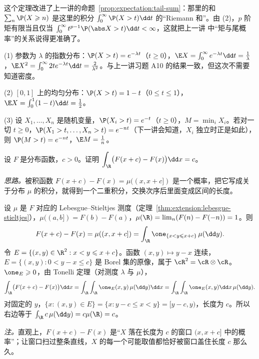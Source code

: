 这个定理改进了上一讲的命题~\ref{prop:expectation:tail-sum}：那里的和 $\sum_n\P(X\geqslant n)$ 是这里的积分 $\int_0^\infty \P(X>t)\dd t$ 的“Riemann 和”。由 (2)，$p$ 阶矩有限当且仅当 $\int_0^\infty t^{p-1}\P(\abs X>t)\dd t<\infty$，这就把上一讲 中“矩与尾概率”的关系说得更准确了。

\begin{example}
(1) 参数为 $\lambda$ 的指数分布：$\P(X>t)=e^{-\lambda t}$（$t\geqslant0$），$\E X=\int_0^\infty e^{-\lambda t}\dd t=\frac1\lambda$，$\E X^2=\int_0^\infty2te^{-\lambda t}\dd t=\frac2{\lambda^2}$。与上一讲习题 A10 的结果一致，但这次不需要知道密度。

(2) $[0,1]$ 上的均匀分布：$\P(X>t)=1-t$（$0\leqslant t\leqslant1$），$\E X=\int_0^1(1-t)\dd t=\frac12$。

(3) 设 $X_1,\dots,X_n$ 是随机变量，$\P(X_i>t)=e^{-t}$（$t\geqslant0$），$M=\min_iX_i$。若对一切 $t\geqslant0$，$\P(X_1>t,\dots,X_n>t)=e^{-nt}$（下一讲会知道，$X_i$ 独立时正是如此），则 $\P(M>t)=e^{-nt}$，$\E M=\frac1n$。
\end{example}

\begin{workedexample}\label{we:product:shift-integral}
设 $F$ 是分布函数，$c>0$。证明 $\displaystyle\int_\R\bigl(F(x+c)-F(x)\bigr)\dd x=c$。
\end{workedexample}
\begin{solution}
\emph{思路。}被积函数 $F(x+c)-F(x)=\mu((x,x+c])$ 是一个概率，把它写成关于分布 $\mu$ 的积分，就得到一个二重积分，交换次序后里面变成区间的长度。

设 $\mu$ 是 $F$ 对应的 Lebesgue--Stieltjes 测度（定理~\ref{thm:extension:lebesgue-stieltjes}），$\mu((a,b])=F(b)-F(a)$，$\mu(\R)=\lim_{n}(F(n)-F(-n))=1$。则
\[
F(x+c)-F(x)=\mu((x,x+c])=\int_\R\one_{\{x<y\leqslant x+c\}}\,\mu(\dd y).
\]
令 $E=\{(x,y)\in\R^2:x<y\leqslant x+c\}$。函数 $(x,y)\mapsto y-x$ 连续，$E=\{(x,y):0<y-x\leqslant c\}$ 是 Borel 集的原像，属于 $\cR^2=\cR\otimes\cR$。$\one_E\geqslant0$，由 Tonelli 定理（对测度 $\lambda$ 与 $\mu$），
\[
\int_\R\bigl(F(x+c)-F(x)\bigr)\dd x=\int_\R\int_\R\one_E(x,y)\,\mu(\dd y)\dd x=\int_\R\int_\R\one_E(x,y)\dd x\,\mu(\dd y).
\]
对固定的 $y$，$\{x:(x,y)\in E\}=\{x:y-c\leqslant x<y\}=[y-c,y)$，长度为 $c$。所以右边等于 $\int_\R c\,\mu(\dd y)=c\mu(\R)=c$。

\emph{注。}直观上，$F(x+c)-F(x)$ 是“$X$ 落在长度为 $c$ 的窗口 $(x,x+c]$ 中的概率”；让窗口扫过整条直线，$X$ 的每一个可能取值都恰好被窗口盖住长度 $c$ 那么久。
\end{solution}

